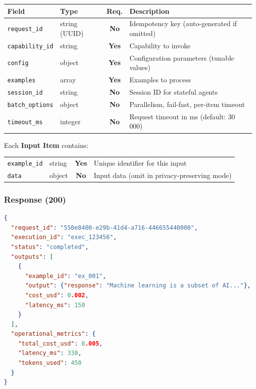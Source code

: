 \documentclass[11pt,a4paper]{article}
\newcommand{\field}[1]{\texttt{#1}}
\newcommand{\required}{\textbf{Yes}}
\newcommand{\optional}{\textbf{No}}
\begin{document}
\begin{center}\small
\begin{tabularx}{\textwidth}{@{}llcX@{}}
\toprule
\textbf{Field} & \textbf{Type} & \textbf{Req.} & \textbf{Description} \\
\midrule
\field{request\_id}    & string (UUID) & \optional & Idempotency key (auto-generated if omitted) \\
\field{capability\_id} & string        & \required & Capability to invoke \\
\field{config}         & object        & \required & Configuration parameters (tunable values) \\
\field{examples}       & array         & \required & Examples to process \\
\field{session\_id}    & string        & \optional & Session ID for stateful agents \\
\field{batch\_options} & object        & \optional & Parallelism, fail-fast, per-item timeout \\
\field{timeout\_ms}    & integer       & \optional & Request timeout in ms (default: 30\,000) \\
\bottomrule
\end{tabularx}
\end{center}

Each \textbf{Input Item} contains:

\begin{center}\small
\begin{tabularx}{\textwidth}{@{}llcX@{}}
\toprule
\field{example\_id} & string & \required & Unique identifier for this input \\
\field{data}      & object & \optional & Input data (omit in privacy-preserving mode) \\
\bottomrule
\end{tabularx}
\end{center}

\subsubsection{Response (200)}

\begin{lstlisting}[language=json]
{
  "request_id": "550e8400-e29b-41d4-a716-446655440000",
  "execution_id": "exec_123456",
  "status": "completed",
  "outputs": [
    {
      "example_id": "ex_001",
      "output": {"response": "Machine learning is a subset of AI..."},
      "cost_usd": 0.002,
      "latency_ms": 150
    }
  ],
  "operational_metrics": {
    "total_cost_usd": 0.005,
    "latency_ms": 330,
    "tokens_used": 450
  }
}
\end{lstlisting}
\end{document}
